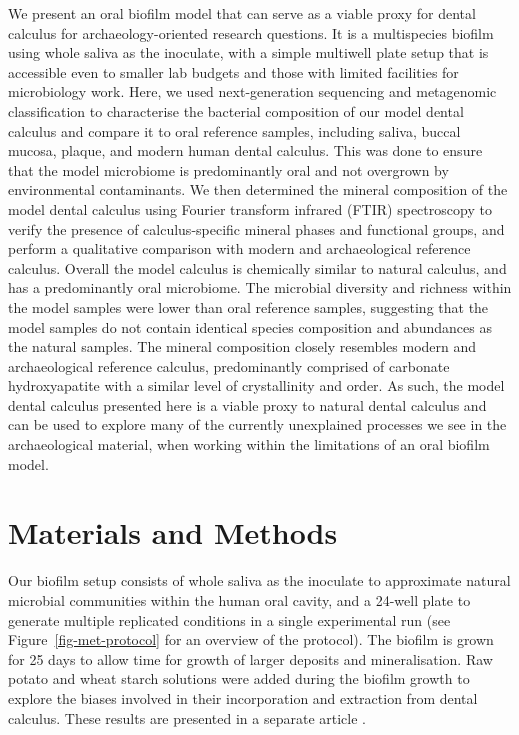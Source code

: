 \documentclass[10pt,a4paper]{article}
\begin{document}
We present an oral biofilm model that can serve as a viable proxy for
dental calculus for archaeology-oriented research questions. It is a
multispecies biofilm using whole saliva as the inoculate, with a simple
multiwell plate setup that is accessible even to smaller lab budgets and
those with limited facilities for microbiology work. Here, we used
next-generation sequencing and metagenomic classification to
characterise the bacterial composition of our model dental calculus and
compare it to oral reference samples, including saliva, buccal mucosa,
plaque, and modern human dental calculus. This was done to ensure that
the model microbiome is predominantly oral and not overgrown by
environmental contaminants. We then determined the mineral composition
of the model dental calculus using Fourier transform infrared (FTIR)
spectroscopy to verify the presence of calculus-specific mineral phases
and functional groups, and perform a qualitative comparison with modern
and archaeological reference calculus. Overall the model calculus is
chemically similar to natural calculus, and has a predominantly oral
microbiome. The microbial diversity and richness within the model
samples were lower than oral reference samples, suggesting that the
model samples do not contain identical species composition and
abundances as the natural samples. The mineral composition closely
resembles modern and archaeological reference calculus, predominantly
comprised of carbonate hydroxyapatite with a similar level of
crystallinity and order. As such, the model dental calculus presented
here is a viable proxy to natural dental calculus and can be used to
explore many of the currently unexplained processes we see in the
archaeological material, when working within the limitations of an oral
biofilm model.

\section{Materials and Methods}\label{materials-and-methods}

Our biofilm setup consists of whole saliva as the inoculate to
approximate natural microbial communities within the human oral cavity,
and a 24-well plate to generate multiple replicated conditions in a
single experimental run (see Figure~\ref{fig-met-protocol} for an
overview of the protocol). The biofilm is grown for 25 days to allow
time for growth of larger deposits and mineralisation. Raw potato and
wheat starch solutions were added during the biofilm growth to explore
the biases involved in their incorporation and extraction from dental
calculus. These results are presented in a separate article
\citep{bartholdyInvestigatingBiases2022}.
\end{document}
